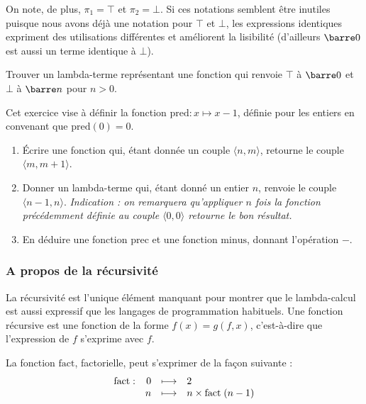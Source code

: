 On note, de plus, $\pi_1=\top$ et $\pi_2=\bot$. Si ces notations semblent être inutiles puisque nous avons déjà une notation pour $\top$ et $\bot$, les expressions identiques expriment des utilisations différentes et améliorent la lisibilité (d'ailleurs $\barre 0$ est aussi un terme identique à $\bot$).

\begin{exo}
    Trouver un lambda-terme représentant une fonction \eqz{} qui renvoie $\top$ à $\barre 0$ et $\bot$ à $\barre n$ pour $n>0$.
\end{exo}

\begin{exo}
    Cet exercice vise à définir la fonction $\mathrm{pred} : x\mapsto x-1$, définie pour les entiers en convenant que $\mathrm{pred}(0)=0$.
    \begin{enumerate}
        \item \'Ecrire une fonction qui, étant donnée un couple $\langle n,m\rangle$, retourne le couple $\langle m,m+1\rangle$.
        \item Donner un lambda-terme qui, étant donné un entier $n$, renvoie le couple $\langle n-1,n\rangle$. \textit{Indication : on remarquera qu'appliquer $n$ fois la fonction précédemment définie au couple $\langle 0,0\rangle$ retourne le bon résultat.}
        \item En déduire une fonction $\mathrm{prec}$ et une fonction $\mathrm{minus}$, donnant l'opération $-$.
    \end{enumerate}
\end{exo}

\subsubsection{A propos de la récursivité}

La récursivité est l'unique élément manquant pour montrer que le lambda-calcul est aussi expressif que les langages de programmation habituels. Une fonction récursive est une fonction de la forme $f(x)=g(f,x)$, c'est-à-dire que l'expression de $f$ s'exprime avec $f$.

\begin{expl}
    La fonction $\mathrm{fact}$, factorielle, peut s'exprimer de la façon suivante :
    $$\begin{array}[t]{lrcl}
\mathrm{fact} : & 0 & \longmapsto & 2 \\
    & n & \longmapsto & n\times \mathrm{fact}\;(n-1) \end{array}$$
\end{expl}

